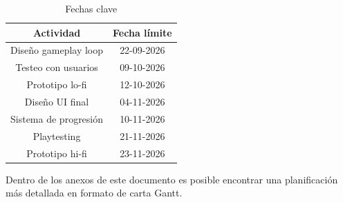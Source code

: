 \documentclass[conference]{IEEEtran}
\begin{document}
\begin{table}[htbp]
    \caption{Fechas clave}
    \begin{center}
        \begin{tabular}{|c|c|}\hline
            \textbf{Actividad} & \textbf{Fecha límite} \\\hline
            Diseño gameplay loop & 22-09-2026 \\\hline
            Testeo con usuarios & 09-10-2026 \\\hline
            Prototipo lo-fi & 12-10-2026 \\\hline
            Diseño UI final & 04-11-2026 \\\hline
            Sistema de progresión & 10-11-2026 \\\hline
            Playtesting & 21-11-2026 \\\hline
            Prototipo hi-fi & 23-11-2026 \\\hline
        \end{tabular}
        \label{fechasclave}
    \end{center}
\end{table}

Dentro de los anexos de este documento es posible encontrar una planificación más detallada en formato de carta Gantt.

\printbibliography

\newpage


\end{document}
